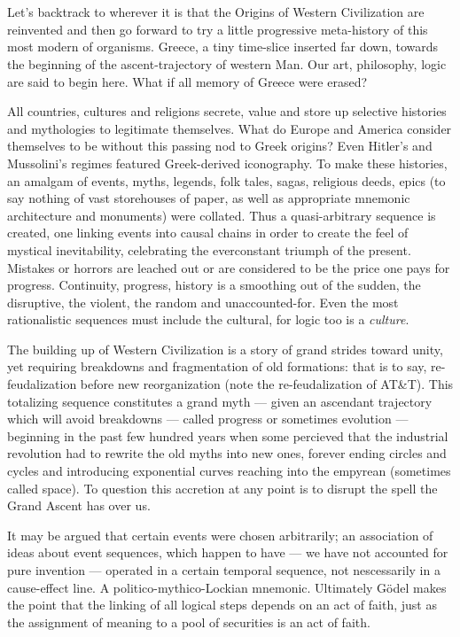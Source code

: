 \chapter{}

Let's backtrack to wherever it is that
the Origins of Western Civilization are reinvented and then go forward to try a little
progressive meta-history of this most modern of organisms. Greece, a tiny time-slice
inserted far down, towards the beginning of
the ascent-trajectory of western Man. Our
art, philosophy, logic are said to begin here.
What if all memory of Greece were erased?

All countries, cultures and religions secrete, value and store up selective histories
and mythologies to legitimate themselves.
What do Europe and America consider themselves to be without this passing nod to Greek
origins? Even Hitler's and Mussolini's regimes featured Greek-derived iconography.
To make these histories, an amalgam of
events, myths, legends, folk tales, sagas,
religious deeds, epics (to say nothing of vast
storehouses of paper, as well as appropriate
mnemonic architecture and monuments)
were collated. Thus a quasi-arbitrary sequence is created, one linking events into
causal chains in order to create the feel of
mystical inevitability, celebrating the everconstant triumph of the present. Mistakes or
horrors are leached out or are considered to
be the price one pays for progress. Continuity, progress, history is a smoothing out
of the sudden, the disruptive, the violent, the
random and unaccounted-for. Even the most
rationalistic sequences must include the cultural, for logic too is a \emph{culture}.

The building up of Western Civilization is
a story of grand strides toward unity, yet
requiring breakdowns and fragmentation of
old formations: that is to say, re-feudalization before new reorganization (note the
re-feudalization of AT\&T). This totalizing
sequence constitutes a grand myth --- given
an ascendant trajectory which will avoid
breakdowns --- called progress or sometimes
evolution --- beginning in the past few hundred years when some percieved that the
industrial revolution had to rewrite the old
myths into new ones, forever ending circles
and cycles and introducing exponential
curves reaching into the empyrean (sometimes called space). To question this accretion at any point is to disrupt the spell the Grand Ascent has over us.

It may be argued that certain events were
chosen arbitrarily; an association of ideas
about event sequences, which happen to
have --- we have not accounted for pure invention --- operated in a certain temporal sequence, not nescessarily in a cause-effect
line. A politico-mythico-Lockian mnemonic.
Ultimately G\"{o}del makes the point that the
linking of all logical steps depends on an act
of faith, just as the assignment of meaning to
a pool of securities is an act of faith.

